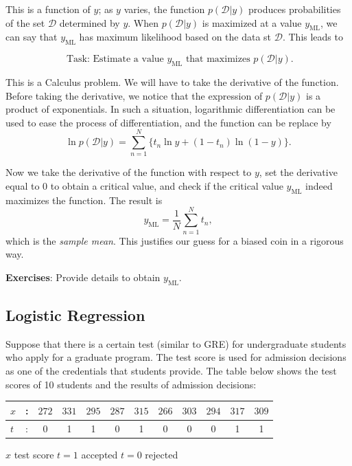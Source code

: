 \documentclass[
]{article}
\begin{document}
This is a function of \(y\); as \(y\) varies, the function
\(p(\mathcal D|y)\) produces probabilities of the set \(\mathcal D\)
determined by \(y\). When \(p(\mathcal D|y)\) is maximized at a value
\(y_{\mathrm {ML}}\), we can say that \(y_{\mathrm{ML}}\) has maximum
likelihood based on the data st \(\mathcal D\). This leads to

\[\text{ Task: Estimate a value $y_{\mathrm{ML}}$ that maximizes $p(\mathcal D|y)$}.\]

This is a Calculus problem. We will have to take the derivative of the
function. Before taking the derivative, we notice that the expression of
\(p(\mathcal D|y)\) is a product of exponentials. In such a situation,
logarithmic differentiation can be used to ease the process of
differentiation, and the function can be replace by
\[ \ln p(\mathcal D|y) = \sum_{n=1}^N \{ t_n \ln y + (1-t_n) \ln(1-y)\} .\]

Now we take the derivative of the function with respect to \(y\), set
the derivative equal to \(0\) to obtain a critical value, and check if
the critical value \(y_{\mathrm{ML}}\) indeed maximizes the function.
The result is \[ y_{\mathrm{ML}}= \frac 1 N \sum_{n=1}^N t_n ,\] which
is the \emph{sample mean}. This justifies our guess for a biased coin in
a rigorous way.

\textbf{Exercises}: Provide details to obtain \(y_{\mathrm{ML}}\).

\hypertarget{logistic-regression-1}{%
\subsection{Logistic Regression}\label{logistic-regression-1}}

Suppose that there is a certain test (similar to GRE) for undergraduate
students who apply for a graduate program. The test score is used for
admission decisions as one of the credentials that students provide. The
table below shows the test scores of 10 students and the results of
admission decisions:

\begin{longtable}[]{@{}llcccccccccc@{}}
\toprule
\(x\) & : & \(272\) & \(331\) & \(295\) & \(287\) & \(315\) & \(266\) &
\(303\) & \(294\) & \(317\) & \(309\)\tabularnewline
\midrule
\endhead
\(t\) & : & 0 & 1 & 1 & 0 & 1 & 0 & 0 & 0 & 1 & 1\tabularnewline
\bottomrule
\end{longtable}

\(x\) test score \(t=1\) accepted \(t=0\) rejected
\end{document}
